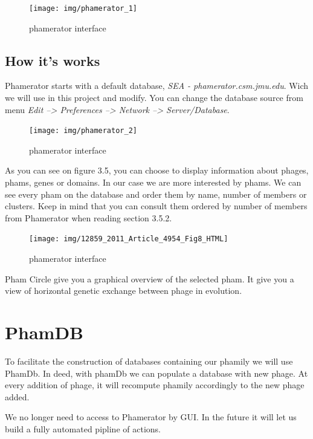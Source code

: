 \documentclass[a4paper,11pt]{report}
\begin{document}
\begin{figure}[H] 
	\begin{center}
		\texttt{[image: img/phamerator\_1]}
		\caption{phamerator interface}
	\end{center}
\end{figure}

\subsection{How it's works}

Phamerator starts with a default database, \textit{SEA - phamerator.csm.jmu.edu}. Wich we will use in this project and modify. You can change the database source from menu \textit{Edit --> Preferences --> Network --> Server/Database}.

\begin{figure}[H] 
	\begin{center}
		\texttt{[image: img/phamerator\_2]}
		\caption{phamerator interface}
	\end{center}
\end{figure}

As you can see on figure 3.5, you can choose to display information about phages, phams, genes or domains. In our case we are more interested by phams. We can see every pham on the database and order them by name, number of members or clusters. Keep in mind that you can consult them ordered by number of members from Phamerator when reading section 3.5.2.

\begin{figure}[H] 
	\begin{center}
		\texttt{[image: img/12859\_2011\_Article\_4954\_Fig8\_HTML]}
		\caption{phamerator interface}
	\end{center}
\end{figure}

Pham Circle give you a graphical overview of the selected pham. It give you a view of horizontal genetic exchange between phage in evolution.

\section{PhamDB}
To facilitate the construction of databases containing our phamily we will use PhamDb. In deed, with phamDb we can populate a database with new phage. At every addition of phage, it will recompute phamily accordingly to the new phage added. 

We no longer need to access to Phamerator by GUI. In the future it will let us build a fully automated pipline of actions.
\end{document}
